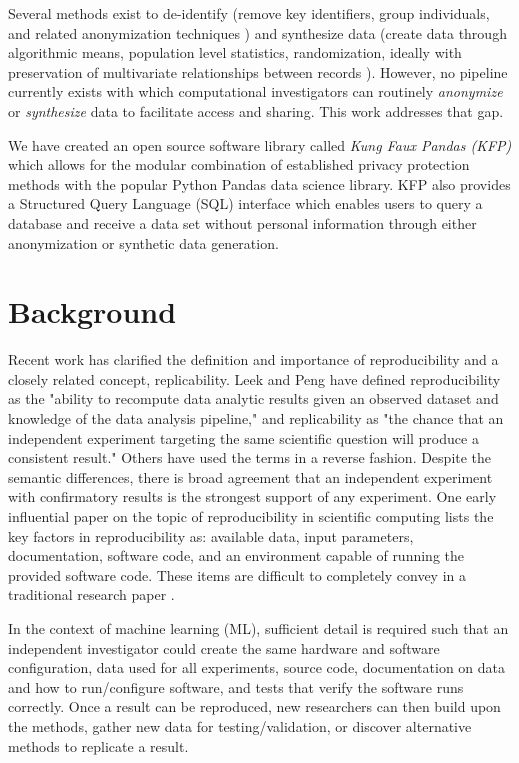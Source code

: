 \documentclass{amia}
\begin{document}
Several methods exist to de-identify (remove key identifiers, group individuals, and related anonymization techniques \cite{hippapro}) and synthesize data (create data through algorithmic means, population level statistics, randomization, ideally with preservation of multivariate relationships between records \cite{walonoski_synthea_2018, patki_synthetic_2016, choi_generating_2017}). However, no pipeline currently exists with which computational investigators can routinely \emph{anonymize} or \emph{synthesize} data to facilitate access and sharing. This work addresses that gap.

We have created an open source software library called \emph{Kung Faux Pandas (KFP)} which allows for the modular combination of established privacy protection methods with the popular Python Pandas data science library\cite{mckinney-proc-scipy-2010}. KFP also provides a Structured Query Language (SQL) interface which enables users to query a database and receive a data set without personal information through either anonymization or synthetic data generation.

\section{Background}

Recent work has clarified the definition and importance of reproducibility and a closely related concept, replicability. Leek and Peng have defined reproducibility as the "ability to recompute data analytic results given an observed dataset and knowledge of the data analysis pipeline," and replicability as "the chance that an independent experiment targeting the same scientific question will produce a consistent result."\cite{leek_opinion_2015,peng_reproducible_2006} Others have used the terms in a reverse fashion\cite{drummond_replicability_2009}. Despite the semantic differences, there is broad agreement that an independent experiment with confirmatory results is the strongest support of any experiment. One early influential paper on the topic of reproducibility in scientific computing lists the key factors in reproducibility as: available data, input parameters, documentation, software code, and an environment capable of running the provided software code. These items are difficult to completely convey in a traditional research paper \cite{schwab_making_2000}.

In the context of machine learning (ML), sufficient detail is required such that an independent investigator could create the same hardware and software configuration, data used for all experiments, source code, documentation on data and how to run/configure software, and tests that verify the software runs correctly. Once a result can be reproduced, new researchers can then build upon the methods, gather new data for testing/validation, or discover alternative methods to replicate a result.
\end{document}
